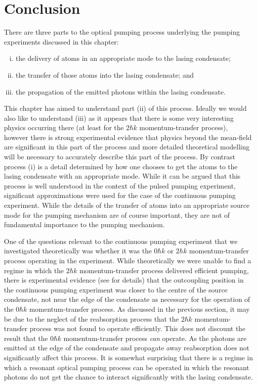 \section{Conclusion}

There are three parts to the optical pumping process underlying the pumping experiments discussed in this chapter:
\begin{enumerate}[(i)]
    \item the delivery of atoms in an appropriate mode to the lasing condensate;
    \item the transfer of those atoms into the lasing condensate; and
    \item the propagation of the emitted photons within the lasing condensate.
\end{enumerate}
This chapter has aimed to understand part (ii) of this process.  Ideally we would also like to understand (iii) as it appears that there is some very interesting physics occurring there (at least for the $2 \hbar k$ momentum-transfer process), however there is strong experimental evidence that physics beyond the mean-field are significant in this part of the process and more detailed theoretical modelling will be necessary to accurately describe this part of the process.  By contrast process (i) is a detail determined by how one chooses to get the atoms to the lasing condensate with an appropriate mode.  While it can be argued that this process is well understood in the context of the pulsed pumping experiment, significant approximations were used for the case of the continuous pumping experiment.  While the details of the transfer of atoms into an appropriate source mode for the pumping mechanism are of course important, they are not of fundamental importance to the pumping mechanism.

One of the questions relevant to the continuous pumping experiment that we investigated theoretically was whether it was the $0 \hbar k$ or $2 \hbar k$ momentum-transfer process operating in the experiment.  While theoretically we were unable to find a regime in which the $2 \hbar k$ momentum-transfer process delivered efficient pumping, there is experimental evidence (see \citep{Doring:2009} for details) that the outcoupling position in the continuous pumping experiment was closer to the centre of the source condensate, not near the edge of the condensate as necessary for the operation of the $0 \hbar k$ momentum-transfer process.  As discussed in the previous section, it may be due to the neglect of the reabsorption process that the $2 \hbar k$ momentum-transfer process was not found to operate efficiently.  This does not discount the result that the $0 \hbar k$ momentum-transfer process \emph{can} operate.  As the photons are emitted at the edge of the condensate and propagate away reabsorption does not significantly affect this process.  It is somewhat surprising that there is a regime in which a resonant optical pumping process can be operated in which the resonant photons do not get the chance to interact significantly with the lasing condensate.

